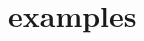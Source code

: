 \documentclass[10pt,openany]{book}
\begin{document}
\section{examples}


%


%

%
%
%

%


%

%

%

%
\end{document}
